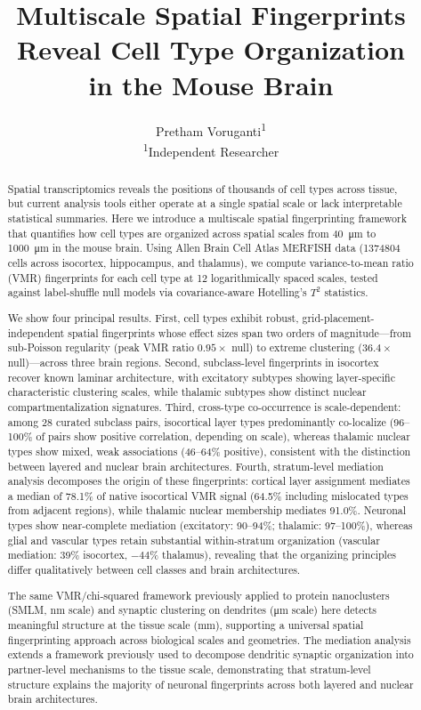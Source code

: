 \documentclass[11pt,a4paper]{article}
\title{Multiscale Spatial Fingerprints Reveal Cell Type Organization\\in the Mouse Brain}
\author{
  Pretham Voruganti\textsuperscript{1}
  \\[0.5em]
  \small\textsuperscript{1}Independent Researcher
}
\date{}
\begin{document}
\maketitle

\begin{abstract}
Spatial transcriptomics reveals the positions of thousands of cell types across
tissue, but current analysis tools either operate at a single spatial scale or
lack interpretable statistical summaries. Here we introduce a multiscale spatial
fingerprinting framework that quantifies how cell types are organized across
spatial scales from \SI{40}{\micro\meter} to \SI{1000}{\micro\meter} in the
mouse brain. Using Allen Brain Cell Atlas MERFISH data
(\num{1374804} cells across isocortex, hippocampus, and thalamus), we compute
variance-to-mean ratio (VMR) fingerprints for each cell type at 12 logarithmically
spaced scales, tested against label-shuffle null models via covariance-aware
Hotelling's $T^2$ statistics.

We show four principal results.
First, cell types exhibit robust, grid-placement-independent spatial fingerprints
whose effect sizes span two orders of magnitude---from sub-Poisson regularity
(peak VMR ratio $0.95\times$ null) to extreme clustering
($36.4\times$ null)---across three brain regions.
Second, subclass-level fingerprints in isocortex recover known laminar
architecture, with excitatory subtypes showing layer-specific characteristic
clustering scales, while thalamic subtypes show distinct nuclear
compartmentalization signatures.
Third, cross-type co-occurrence is scale-dependent: among 28 curated
subclass pairs, isocortical layer types predominantly co-localize
(96--100\% of pairs show positive correlation, depending on scale),
whereas thalamic nuclear types show mixed, weak associations
(46--64\% positive), consistent with the distinction between layered
and nuclear brain architectures.
Fourth, stratum-level mediation analysis decomposes the origin of these
fingerprints: cortical layer assignment mediates a median of 78.1\% of
native isocortical VMR signal (64.5\% including mislocated types from
adjacent regions), while thalamic nuclear membership mediates 91.0\%.
Neuronal types show near-complete mediation (excitatory: 90--94\%; thalamic:
97--100\%), whereas glial and vascular types retain substantial within-stratum
organization (vascular mediation: 39\% isocortex, $-44$\% thalamus),
revealing that the organizing principles differ qualitatively between cell
classes and brain architectures.

The same VMR/chi-squared framework previously applied to protein nanoclusters
(SMLM, nm scale) and synaptic clustering on dendrites (\si{\micro\meter} scale)
here detects meaningful structure at the tissue scale (\si{\milli\meter}),
supporting a universal spatial fingerprinting approach across biological scales
and geometries. The mediation analysis extends a framework previously used to
decompose dendritic synaptic organization into partner-level mechanisms to the
tissue scale, demonstrating that stratum-level structure explains the majority
of neuronal fingerprints across both layered and nuclear brain architectures.
\end{abstract}
\end{document}
